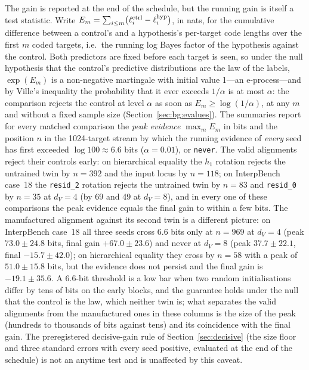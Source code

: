 \documentclass[11pt,a4paper]{article}
\newcommand{\dv}{d_V}
\begin{document}
The gain is reported at the end of the schedule, but the running gain is itself a test statistic. Write $E_m=\sum_{i\le m}\bigl(\ell^{\rm ctrl}_i-\ell^{\rm hyp}_i\bigr)$, in nats, for the cumulative difference between a control's and a hypothesis's per-target code lengths over the first $m$ coded targets, i.e.\ the running log Bayes factor of the hypothesis against the control. Both predictors are fixed before each target is seen, so under the null hypothesis that the control's predictive distributions are the law of the labels, $\exp(E_m)$ is a non-negative martingale with initial value 1---an e-process---and by Ville's inequality the probability that it ever exceeds $1/\alpha$ is at most $\alpha$: the comparison rejects the control at level $\alpha$ as soon as $E_m\ge\log(1/\alpha)$, at any $m$ and without a fixed sample size (Section~\ref{sec:bg:evalues}). The summaries report for every matched comparison the \emph{peak evidence} $\max_m E_m$ in bits and the position $n$ in the 1024-target stream by which the running evidence of \emph{every} seed has first exceeded $\log 100\approx6.6$ bits ($\alpha=0.01$), or \texttt{never}. The valid alignments reject their controls early: on hierarchical equality the $h_1$ rotation rejects the untrained twin by $n=392$ and the input locus by $n=118$; on InterpBench case~18 the \texttt{resid\_2} rotation rejects the untrained twin by $n=83$ and \texttt{resid\_0} by $n=35$ at $\dv=4$ (by 69 and 49 at $\dv=8$), and in every one of these comparisons the peak evidence equals the final gain to within a few bits. The manufactured alignment against its second twin is a different picture: on InterpBench case~18 all three seeds cross 6.6 bits only at $n=969$ at $\dv=4$ (peak $73.0\pm24.8$ bits, final gain $+67.0\pm23.6$) and never at $\dv=8$ (peak $37.7\pm22.1$, final $-15.7\pm42.0$); on hierarchical equality they cross by $n=58$ with a peak of $51.0\pm15.8$ bits, but the evidence does not persist and the final gain is $-19.1\pm35.6$. A 6.6-bit threshold is a low bar when two random initialisations differ by tens of bits on the early blocks, and the guarantee holds under the null that the control is the law, which neither twin is; what separates the valid alignments from the manufactured ones in these columns is the size of the peak (hundreds to thousands of bits against tens) and its coincidence with the final gain. The preregistered decisive-gain rule of Section~\ref{sec:decisive} (the size floor and three standard errors with every seed positive, evaluated at the end of the schedule) is not an anytime test and is unaffected by this caveat.
\end{document}
